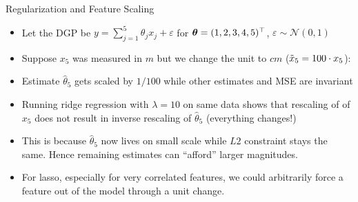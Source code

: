 \documentclass[11pt,compress,t,notes=noshow, xcolor=table]{beamer}
\begin{document}
\begin{vbframe}{Regularization and Feature Scaling}
\footnotesize{
\begin{itemize}
    \item Let the DGP be $y = \sum_{j=1}^{5} \theta_j x_{j} +\varepsilon$ for $\bm{\theta}=(1,2,3,4,5)^\top$, $\varepsilon \sim \mathcal{N}(0,1)$ %
    \item Suppose $x_5$ was measured in $m$ but we change the unit to $cm$ ($\Tilde{x}_5=100 \cdot x_5$):
\end{itemize}
\vspace{-0.4cm}
\begin{table}[h]
\centering

\end{table}
\vspace{-0.1cm}
\begin{itemize}
    \item Estimate $\hat{\theta}_5$ gets scaled by $1/100$ while other estimates and MSE are invariant
    \item Running ridge regression with $\lambda=10$ on same data shows that rescaling of of $x_5$ does not result in inverse rescaling of $\hat{\theta}_5$ (everything changes!)
    \item This is because $\hat{\theta}_5$ now lives on small scale while $L2$ constraint stays the same. Hence remaining estimates can ``afford'' larger magnitudes.
\end{itemize}
\vspace{-0.4cm}
\begin{table}[h]
\centering

\end{table}
}

\begin{itemize}
    \item For lasso, especially for very correlated features, we could arbitrarily force a feature out of the model through a unit change.
\end{itemize}

\framebreak

\end{vbframe}
\end{document}
